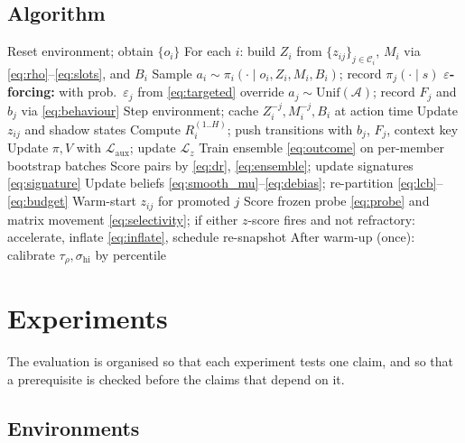 \documentclass[conference]{IEEEtran}
\begin{document}
\subsection{Algorithm}

\begin{algorithm}[t]
\caption{CIG-AMF (one episode)}
\label{alg:cigamf}
\begin{algorithmic}[1]
\STATE Reset environment; obtain $\{o_i\}$
  \STATE For each $i$: build $Z_i$ from $\{z_{ij}\}_{j\in\mathcal{C}_i}$, $M_i$ via \eqref{eq:rho}--\eqref{eq:slots}, and $B_i$
  \STATE Sample $a_i\sim\pi_i(\cdot\mid o_i,Z_i,M_i,B_i)$; record $\pi_j(\cdot\mid s)$
  \STATE \textbf{$\varepsilon$-forcing:} with prob.\ $\varepsilon_j$ from \eqref{eq:targeted} override $a_j\sim\mathrm{Unif}(\mathcal{A})$; record $F_j$ and $b_j$ via \eqref{eq:behaviour}
  \STATE Step environment; cache $Z^{-j}_i,M^{-j}_i,B_i$ at action time
  \STATE Update $z_{ij}$ and shadow states 
\ENDFOR
\STATE Compute $R_i^{(1..H)}$; push transitions with $b_j$, $F_j$, context key
\STATE Update $\pi,V$ with $\mathcal{L}_{\mathrm{aux}}$; update $\mathcal{L}_z$ 
  \STATE Train ensemble \eqref{eq:outcome} on per-member bootstrap batches
  \STATE Score pairs by \eqref{eq:dr}, \eqref{eq:ensemble}; update signatures \eqref{eq:signature}
  \STATE Update beliefs \eqref{eq:smooth_mu}--\eqref{eq:debias}; re-partition \eqref{eq:lcb}--\eqref{eq:budget}
  \STATE Warm-start $z_{ij}$ for promoted $j$
\ENDIF
\STATE Score frozen probe \eqref{eq:probe} and matrix movement \eqref{eq:selectivity}; if either $z$-score fires and not refractory: accelerate, inflate \eqref{eq:inflate}, schedule re-snapshot
\STATE After warm-up (once): calibrate $\tau_\rho,\sigma_{\mathrm{hi}}$ by percentile
\end{algorithmic}
\end{algorithm}

\section{Experiments}

The evaluation is organised so that each experiment tests one claim, and so that a prerequisite is checked before the claims that depend on it.

\subsection{Environments}
\end{document}
